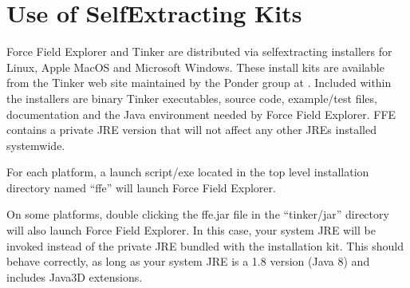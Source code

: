 \documentclass[letterpaper,11pt,english]{sphinxmanual}
\begin{document}
\section{Use of Self\sphinxhyphen{}Extracting Kits}
\label{\detokenize{text/installation:use-of-self-extracting-kits}}
Force Field Explorer and Tinker are distributed via self\sphinxhyphen{}extracting installers for Linux, Apple MacOS and Microsoft Windows. These install kits are available from the Tinker web site maintained by the Ponder group at . Included within the installers are binary Tinker executables, source code, example/test files, documentation and the Java environment needed by Force Field Explorer. FFE contains a private JRE version that will not affect any other JREs installed system\sphinxhyphen{}wide.

For each platform, a launch script/exe located in the top level installation directory named “ffe” will launch Force Field Explorer.

On some platforms, double clicking the ffe.jar file in the “tinker/jar” directory will also launch Force Field Explorer. In this case, your system JRE will be invoked instead of the private JRE bundled with the installation kit. This should behave correctly, as long as your system JRE is a 1.8 version (Java 8) and includes Java3D extensions.
\end{document}
